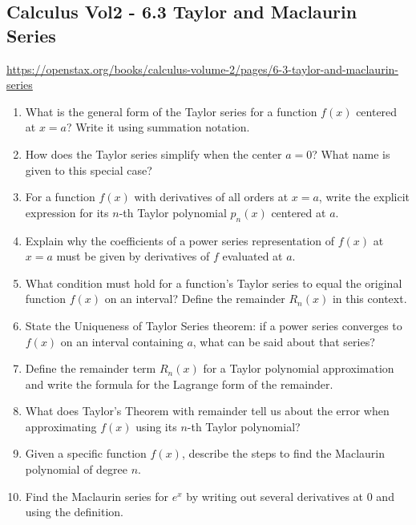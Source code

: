 \subsection{Calculus Vol2 - 6.3 Taylor and Maclaurin Series}

\url{https://openstax.org/books/calculus-volume-2/pages/6-3-taylor-and-maclaurin-series}

\begin{enumerate}

\item What is the general form of the Taylor series for a function \(f(x)\) centered at \(x=a\)? Write it using summation notation.

\item How does the Taylor series simplify when the center \(a=0\)? What name is given to this special case?

\item For a function \(f(x)\) with derivatives of all orders at \(x=a\), write the explicit expression for its \(n\)-th Taylor polynomial \(p_n(x)\) centered at \(a\).

\item Explain why the coefficients of a power series representation of \(f(x)\) at \(x=a\) must be given by derivatives of \(f\) evaluated at \(a\).

\item What condition must hold for a function’s Taylor series to equal the original function \(f(x)\) on an interval? Define the remainder \(R_n(x)\) in this context.

\item State the Uniqueness of Taylor Series theorem: if a power series converges to \(f(x)\) on an interval containing \(a\), what can be said about that series?

\item Define the remainder term \(R_n(x)\) for a Taylor polynomial approximation and write the formula for the Lagrange form of the remainder.

\item What does Taylor’s Theorem with remainder tell us about the error when approximating \(f(x)\) using its \(n\)-th Taylor polynomial?

\item Given a specific function \(f(x)\), describe the steps to find the Maclaurin polynomial of degree \(n\).

\item Find the Maclaurin series for \(e^x\) by writing out several derivatives at 0 and using the definition.


\end{enumerate}
